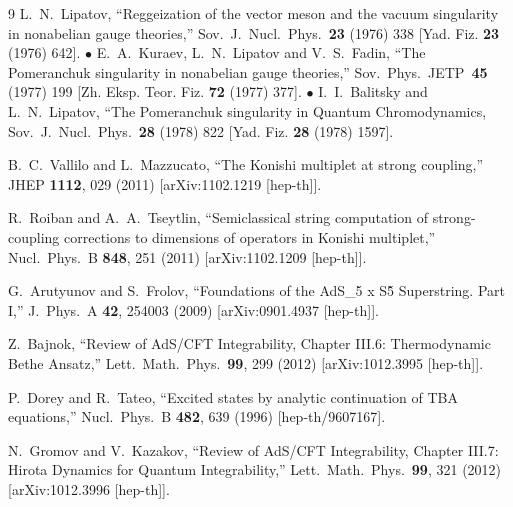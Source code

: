 \documentclass[a4paper,11pt]{article}
\numberwithin{equation}{section}
\begin{document}
\begin{thebibliography} {9}
  L.~N.~Lipatov, ``Reggeization of the vector meson and the vacuum singularity in nonabelian gauge theories,'' Sov.\ J.\ Nucl.\ Phys.\ {\bf 23} (1976) 338 [Yad. Fiz. {\bf 23} (1976) 642]. $\bullet$
  E.~A.~Kuraev, L.~N.~Lipatov and V.~S.~Fadin, ``The Pomeranchuk singularity in nonabelian gauge theories,'' Sov.\ Phys.\ JETP\ {\bf 45} (1977) 199 [Zh. Eksp. Teor. Fiz. {\bf 72} (1977) 377]. $\bullet$
  I.~I.~Balitsky and L.~N.~Lipatov, ``The Pomeranchuk singularity in Quantum Chromodynamics,\\ Sov.\ J.\ Nucl.\ Phys.\ {\bf 28} (1978) 822 [Yad. Fiz. {\bf 28} (1978) 1597].

  B.~C.~Vallilo and L.~Mazzucato,
  ``The Konishi multiplet at strong coupling,''
  JHEP {\bf 1112}, 029 (2011)
  [arXiv:1102.1219 [hep-th]].

  R.~Roiban and A.~A.~Tseytlin,
  ``Semiclassical string computation of strong-coupling corrections to dimensions of operators in Konishi multiplet,''
  Nucl.\ Phys.\ B {\bf 848}, 251 (2011)
  [arXiv:1102.1209 [hep-th]].

  G.~Arutyunov and S.~Frolov,
  ``Foundations of the AdS\_5 x S\^5 Superstring. Part I,''
  J.\ Phys.\ A {\bf 42}, 254003 (2009)
  [arXiv:0901.4937 [hep-th]].

  Z.~Bajnok,
  ``Review of AdS/CFT Integrability, Chapter III.6: Thermodynamic Bethe Ansatz,''
  Lett.\ Math.\ Phys.\  {\bf 99}, 299 (2012)
  [arXiv:1012.3995 [hep-th]].

  P.~Dorey and R.~Tateo,
  ``Excited states by analytic continuation of TBA equations,''
  Nucl.\ Phys.\ B {\bf 482}, 639 (1996)
  [hep-th/9607167].

  N.~Gromov and V.~Kazakov,
  ``Review of AdS/CFT Integrability, Chapter III.7: Hirota Dynamics for Quantum Integrability,''
  Lett.\ Math.\ Phys.\  {\bf 99}, 321 (2012)
  [arXiv:1012.3996 [hep-th]].


\end{thebibliography}
\end{document}
